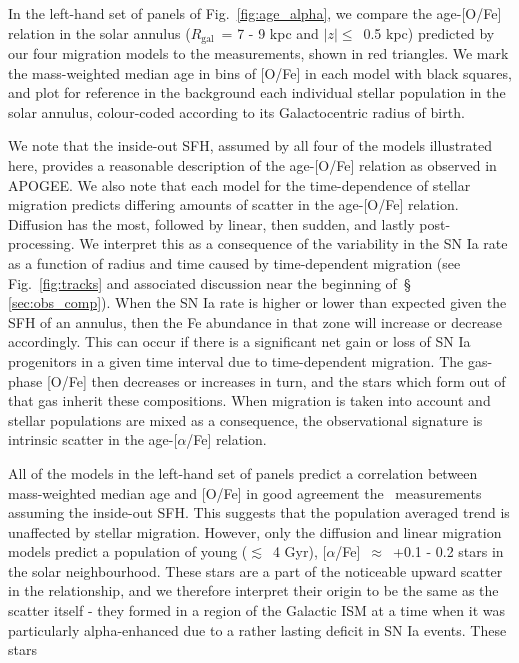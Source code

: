 \documentclass[fleqn, usenatbib]{mnras}
\begin{document}
In the left-hand set of panels of Fig.~\ref{fig:age_alpha}, we compare the 
age-[O/Fe] relation in the solar annulus ($R_\text{gal}$~= 7 - 9 kpc and 
$\left|z\right|\leq$~0.5 kpc) predicted by our four migration models to the 
\citet{Feuillet2019} measurements, shown in red triangles. We mark the 
mass-weighted median age in bins of [O/Fe] in each model with black squares, 
and plot for reference in the background each individual stellar population in 
the solar annulus, colour-coded according to its Galactocentric radius of birth. 
\par 
We note that the inside-out SFH, assumed by all four of the models illustrated 
here, provides a reasonable description of the age-[O/Fe] relation as observed 
in APOGEE. We also note that each model for the time-dependence of stellar 
migration predicts differing amounts of scatter in the age-[O/Fe] relation. 
Diffusion has the most, followed by linear, then sudden, and lastly 
post-processing. We interpret this as a consequence of the variability in the 
SN Ia rate as a function of radius and time caused by time-dependent migration 
(see Fig.~\ref{fig:tracks} and associated discussion near the beginning of~\S 
\ref{sec:obs_comp}). When the SN Ia rate is higher or lower than expected given 
the SFH of an annulus, then the Fe abundance in that zone will increase or 
decrease accordingly. This can occur if there is a significant net gain or loss 
of SN Ia progenitors in a given time interval due to time-dependent migration. 
The gas-phase [O/Fe] then decreases or increases in turn, and the stars which 
form out of that gas inherit these compositions. When migration is taken into 
account and stellar populations are mixed as a consequence, the observational 
signature is intrinsic scatter in the age-[$\alpha$/Fe] relation. 
\par 
All of the models in the left-hand set of panels predict a correlation between 
mass-weighted median age and [O/Fe] in good agreement the~\citet{Feuillet2019} 
measurements assuming the inside-out SFH. This suggests that the population 
averaged trend is unaffected by stellar migration. However, only the diffusion 
and linear migration models predict a population of young ($\lesssim$~4 Gyr), 
[$\alpha$/Fe]~$\approx$~+0.1 - 0.2 stars in the solar neighbourhood. These 
stars are a part of the noticeable upward scatter in the relationship, and we 
therefore interpret their origin to be the same as the scatter itself - they 
formed in a region of the Galactic ISM at a time when it was particularly 
alpha-enhanced due to a rather lasting deficit in SN Ia events. These stars 
\end{document}
